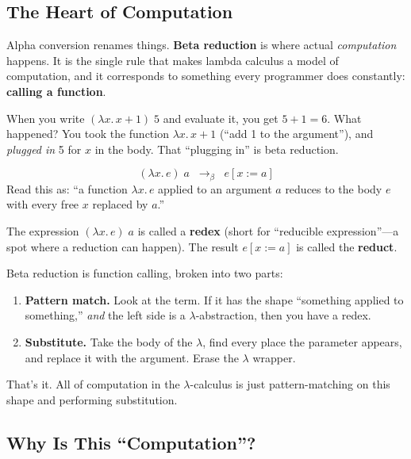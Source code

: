 \documentclass[11pt,a4paper]{article}
\theoremstyle{definition}
\newcommand{\lam}{\lambda}
\newcommand{\reduce}{\longrightarrow_\beta}
\begin{document}
\subsection{The Heart of Computation}

Alpha conversion renames things. \textbf{Beta reduction} is where actual
\emph{computation} happens. It is the single rule that makes lambda calculus a
model of computation, and it corresponds to something every programmer does
constantly: \textbf{calling a function}.

When you write $(\lam x.\, x + 1)\; 5$ and evaluate it, you get $5 + 1 = 6$.
What happened? You took the function $\lam x.\, x + 1$ (``add 1 to the
argument''), and \emph{plugged in} 5 for $x$ in the body. That ``plugging in''
is beta reduction.

\begin{defnbox}
\[
  \boxed{\;(\lam x.\, e)\; a \;\;\reduce\;\; e[x := a]\;}
\]
Read this as: ``a function $\lam x.\, e$ applied to an argument $a$
reduces to the body $e$ with every free $x$ replaced by $a$.''

\medskip
The expression $(\lam x.\, e)\; a$ is called a \textbf{redex} (short for
``reducible expression''---a spot where a reduction can happen). The result
$e[x := a]$ is called the \textbf{reduct}.
\end{defnbox}

\begin{intuition}
Beta reduction is function calling, broken into two parts:
\begin{enumerate}[leftmargin=2em]
\item \textbf{Pattern match.} Look at the term. If it has the shape
  ``something applied to something,'' \emph{and} the left side is a
  $\lam$-abstraction, then you have a redex.
\item \textbf{Substitute.} Take the body of the $\lam$, find every place the
  parameter appears, and replace it with the argument. Erase the $\lam$
  wrapper.
\end{enumerate}
That's it. All of computation in the $\lam$-calculus is just pattern-matching
on this shape and performing substitution.
\end{intuition}

\subsection{Why Is This ``Computation''?}
\end{document}
